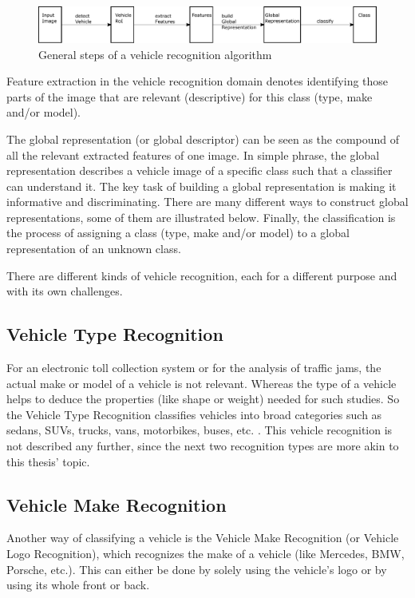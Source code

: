 \begin{figure}[bth]
  \centering
        \includegraphics[width=.95\linewidth]{gfx/vr_steps}
        \caption{General steps of a vehicle recognition algorithm}
        \label{fig:vrSteps}
\end{figure}

Feature extraction in the vehicle recognition domain denotes identifying those parts of the image that are relevant (descriptive) for this class (type, make and/or model).

The global representation (or global descriptor) can be seen as the compound of all the relevant extracted features of one image. In simple phrase, the global representation describes a vehicle image of a specific class such that a classifier can understand it. The key task of building a global representation is making it informative and discriminating. There are many different ways to construct global representations, some of them are illustrated below.
Finally, the classification is the process of assigning a class (type, make and/or model) to a global representation of an unknown class.

There are different kinds of vehicle recognition, each for a different purpose and with its own challenges.

\subsection{Vehicle Type Recognition}
For an electronic toll collection system or for the analysis of traffic jams, the actual make or model of a vehicle is not relevant. Whereas the type of a vehicle helps to deduce the properties (like shape or weight) needed for such studies. So the Vehicle Type Recognition classifies vehicles into broad categories such as sedans, SUVs, trucks, vans, motorbikes, buses, etc. \citep{siddiqui2015robust}. This vehicle recognition is not described any further, since the next two recognition types are more akin to this thesis' topic.

\subsection{Vehicle Make Recognition}
Another way of classifying a vehicle is the Vehicle Make Recognition (or Vehicle Logo Recognition), which recognizes the make of a vehicle (like Mercedes, BMW, Porsche, etc.). This can either be done by solely using the vehicle's logo or by using its whole front or back.

